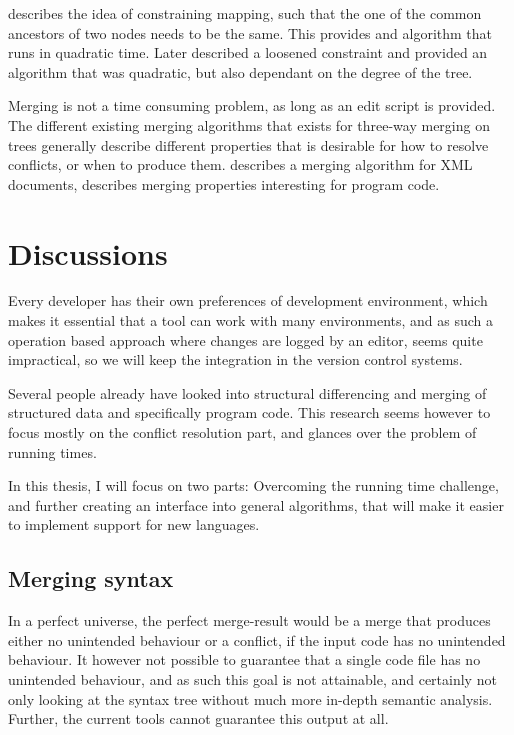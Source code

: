 \documentclass[11pt]{article}
\begin{document}
\citet{Zhang} describes the idea of constraining mapping, such that the one of the common ancestors of two nodes needs to be the same. This provides and algorithm that runs in quadratic time. Later \citet{Lu} described a loosened constraint and provided an algorithm that was quadratic, but also dependant on the degree of the tree.

Merging is not a time consuming problem, as long as an edit script is provided. The different existing merging algorithms that exists for three-way merging on trees generally describe different properties that is desirable for how to resolve conflicts, or when to produce them. \citet{lindholm} describes a merging algorithm for XML documents, \citet{Horwitz,Asklund,Olav} describes merging properties interesting for program code.

\clearpage

\section{Discussions}
Every developer has their own preferences of development environment, which makes it essential that a tool can work with many environments, and as such a operation based approach where changes are logged by an editor, seems quite impractical, so we will keep the integration in the version control systems. 

Several people already have looked into structural differencing and merging of structured data and specifically program code. This research seems however to focus mostly on the conflict resolution part, and glances over the problem of running times. 

In this thesis, I will focus on two parts: Overcoming the running time challenge, and further creating an interface into general algorithms, that will make it easier to implement support for new languages.



\subsection{Merging syntax}
In a perfect universe, the perfect merge-result would be a merge that produces either no unintended behaviour or a conflict, if the input code has no unintended behaviour. It however not possible to guarantee that a single code file has no unintended behaviour, and as such this goal is not attainable, and certainly not only looking at the syntax tree without much more in-depth semantic analysis. Further, the current tools cannot guarantee this output at all.
\end{document}
